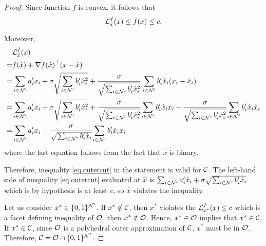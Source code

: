 \begin{proof}



Since function  $f$  is  convex,  it follows that
\begin{equation*}
    \mathcal L^f_{\hat{x}}(x)   \le f(x) \le c.
\end{equation*}


Moreover,
\begin{equation*}
\begin{split}
   &   \mathcal L^f_{\hat{x}}(x)\\
   = &f(\hat{x}) + \nabla{f(\hat{x})} ^\top (x -\hat{x})\\
    =&  \sum_{i \in \mathcal N'} a'_i x_i   +  \sigma\sqrt{{\sum_{i\in \mathcal N'} b'_i \hat{x}_i^2}}+  \frac {\sigma}{ \sqrt{\sum_{i \in \mathcal N'} b'_i \hat{x}_i^2}}\sum_{i \in \mathcal N'}  b'_i \hat{x}_i (x_i-\hat{x}_i)\\
    =& \sum_{i \in \mathcal N'} a'_i x_i  + \sigma\sqrt{{\sum_{i\in \mathcal N'} b'_i \hat{x}_i^2}}+ \frac{\sigma}{  \sqrt{\sum_{i\in \mathcal N'} b'_i \hat{x}_i^2}} {\sum_{i\in \mathcal N'} b'_i \hat{x}_i x_i} -  \frac{\sigma}{  \sqrt{\sum_{i\in \mathcal N'} b'_i \hat{x}_i^2}} {\sum_{i\in \mathcal N'} b'_i \hat{x}_i \hat{x}_i}\\
    =&  \sum_{i \in \mathcal N'} a'_i x_i+ \frac{\sigma}{  \sqrt{\sum_{i\in \mathcal N'} b'_i \hat{x}_i}} {\sum_{i\in \mathcal N'} b'_i \hat{x}_i x_i}
\end{split}
\end{equation*}
where the last equation follows from the fact that $\hat{x}$ is binary.
 
Therefore, inequality \eqref{eq.outercut} in the statement is valid for $\mathcal C$. The left-hand side  of  inequality \eqref{eq.outercut} evaluated at $\hat{x}$ is $ \sum_{i \in \mathcal N'} a'_i \hat{x}_i + \sigma \sqrt{ \sum_{i\in \mathcal N'} b'_i \hat{x}_i} $ which is by hypothesis is at least $c$, so  $\hat{x}$ violates the inequality.

Let us consider $x^\ast \in \{0,1\}^{\mathcal N'}$. If $x^\ast\notin \mathcal C$, then  $x^\ast$ violates the $\mathcal L^f_{x^\ast}(x)   \le c$ which is a facet defining inequality of $\mathcal O$, then  $x^\ast \notin \mathcal O$. Hence, $x^\ast \in \mathcal O$ implies that $x^\ast \in \mathcal C$. If $x^\ast \in  \mathcal C$, since $\mathcal O$ is a polyhedral outer approximation of $\mathcal C$, $x^\ast$ must be in $\mathcal O$. Therefore,  $\mathcal C = \mathcal O \cap  \{0,1\}^{\mathcal N'}$.  \end{proof}


